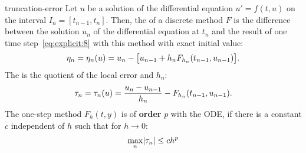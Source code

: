 \begin{Definition}{truncation-error}
  Let $u$ be a solution of the differential equation $u' = f(t,u)$
  on the interval $I_n = [t_{n-1}, t_{n}]$. Then, the  of a discrete method $F$ is the difference between the
  solution $u_n$ of the differential equation at $t_n$ and the result
  of one time step~\eqref{eq:explicit:8} with this method with exact
  initial value:
  \begin{gather}
    \label{eq:explicit:6a}
    \eta_{n} = \eta_n(u) = u_{n} - \bigl[
    u_{n-1} + h_n F_{h_n}(t_{n-1}, u_{n-1})
    \bigr].
  \end{gather}
  The  is the quotient of the local error and $h_n$:
  \begin{gather}
    \label{eq:explicit:6}
    \tau_{n} = \tau_n(u) = \frac{u_{n} - u_{n-1}}{h_n} - F_{h_n}(t_{n-1}, u_{n-1}).
  \end{gather}
  The one-step method $F_h(t,y)$ is  of \textbf{order} $p$ with
  the ODE, if there is a constant $c$ independent of $h$ such that for
  $h\to 0$:
  \begin{gather}
    \label{eq:explicit:3}
    \max\limits_n \lvert\tau_n\rvert \le c h^p
  \end{gather}
\end{Definition}

